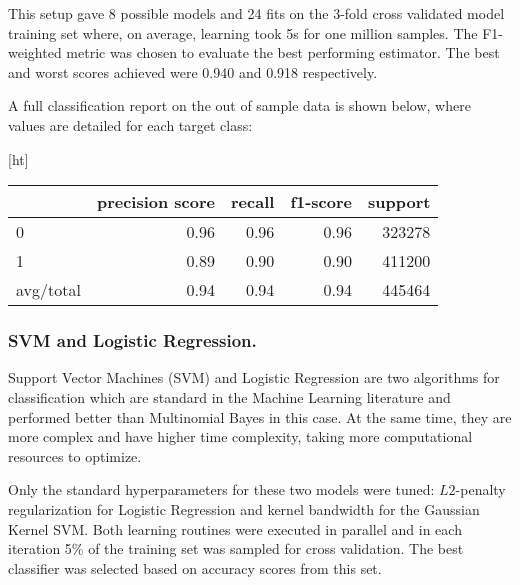 This setup gave 8 possible models and 24 fits on the 3-fold cross validated model training set where, on average, learning took 5s for one million samples. The F1-weighted metric was chosen to evaluate the best performing estimator.
The best and worst scores achieved were 0.940 and 0.918 respectively.

A full classification report on the out of sample data is shown below, where values are detailed for each target class:
\begin{table}\label{tab:classification_report}[ht]
	\centering
	\begin{tabular}{ l r r r r }
		\toprule
		{ } & precision score & recall & f1-score & support \\
		\midrule
		0 		 & 0.96 & 0.96 & 0.96 & 323278 \\
		1		 & 0.89 & 0.90 & 0.90 & 411200 \\
		avg/total & 0.94 & 0.94 & 0.94 & 445464 \\
		\bottomrule
	\end{tabular}
\end{table}


\subsubsection{SVM and Logistic Regression.}

Support Vector Machines (SVM) and Logistic Regression are two algorithms for classification which are standard in the Machine Learning literature and performed better than Multinomial Bayes in this case.
At the same time, they are more complex and have higher time complexity, taking more computational resources to optimize.

Only the standard hyperparameters for these two models were tuned: $L2$-penalty regularization for Logistic Regression and kernel bandwidth for the Gaussian Kernel SVM.\@
Both learning routines were executed in parallel and in each iteration 5\% of the training set was sampled for cross validation. The best classifier was selected based on accuracy scores from this set.




